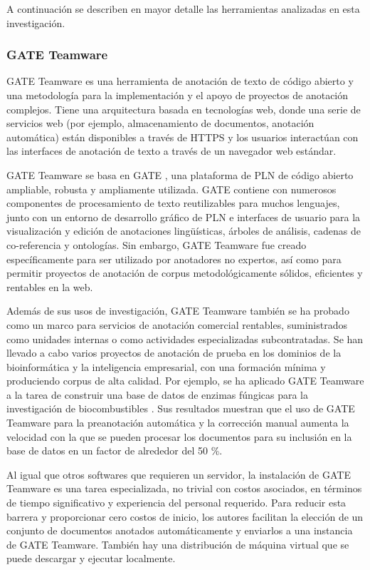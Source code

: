 A continuación se describen en mayor detalle las herramientas analizadas en esta investigación.

\subsubsection*{GATE Teamware}

GATE Teamware es una herramienta de anotación de texto de código abierto y una metodología para la implementación y el apoyo de proyectos de anotación complejos.
Tiene una arquitectura basada en tecnologías web, donde una serie de servicios web (por ejemplo, almacenamiento de documentos, anotación automática) están disponibles a través de HTTPS y los usuarios interactúan con las interfaces de anotación de texto a través de un navegador web estándar.

GATE Teamware se basa en GATE \cite{Cunningham2011}, una plataforma de PLN de código abierto ampliable, robusta y ampliamente utilizada.
GATE contiene con numerosos componentes de procesamiento de texto reutilizables para muchos lenguajes, junto con un entorno de desarrollo gráfico de PLN e interfaces de usuario para la visualización y edición de anotaciones lingüísticas, árboles de análisis, cadenas de co-referencia y ontologías.
Sin embargo, GATE Teamware fue creado específicamente para ser utilizado por anotadores no expertos, así como para permitir proyectos de anotación de corpus metodológicamente sólidos, eficientes y rentables en la web.

Además de sus usos de investigación, GATE Teamware también se ha probado como un marco para servicios de anotación comercial rentables, suministrados como unidades internas o como actividades especializadas subcontratadas.
Se han llevado a cabo varios proyectos de anotación de prueba en los dominios de la bioinformática y la inteligencia empresarial, con una formación mínima y produciendo corpus de alta calidad.
Por ejemplo, se ha aplicado GATE Teamware a la tarea de construir una base de datos de enzimas fúngicas para la investigación de biocombustibles \cite{Meurs2011}.
Sus resultados muestran que el uso de GATE Teamware para la preanotación automática y la corrección manual aumenta la velocidad con la que se pueden procesar los documentos para su inclusión en la base de datos en un factor de alrededor del 50 \%.

Al igual que otros softwares que requieren un servidor, la instalación de GATE Teamware es una tarea especializada, no trivial con costos asociados, en términos de tiempo significativo y experiencia del personal requerido.
Para reducir esta barrera y proporcionar cero costos de inicio, los autores facilitan la elección de un conjunto de documentos anotados automáticamente y enviarlos a una instancia de GATE Teamware.
También hay una distribución de máquina virtual que se puede descargar y ejecutar localmente.

